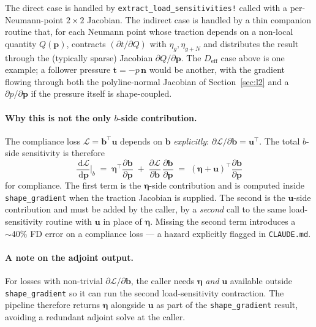 \documentclass[11pt,a4paper]{article}
\newcommand{\vect}[1]{\boldsymbol{#1}}
\newcommand{\pts}{\vect{p}}
\newcommand{\dd}{\,\mathrm{d}}
\newcommand{\Loss}{\mathcal{L}}
\begin{document}
The direct case is handled by
\texttt{extract\_load\_sensitivities!} called with a per-Neumann-point
$2\times 2$ Jacobian. The indirect case is handled by a thin
companion routine that, for each Neumann point whose traction
depends on a non-local quantity $Q(\pts)$, contracts
$(\partial t/\partial Q)$ with $\eta_g, \eta_{g+N}$ and distributes
the result through the (typically sparse) Jacobian
$\partial Q/\partial\pts$. The $D_{\text{eff}}$ case above is one
example; a follower pressure
$\vect t = -p\,\vect n$ would be another, with the gradient
flowing through both the polyline-normal Jacobian
of Section~\ref{sec:l2} and a $\partial p/\partial\pts$ if the
pressure itself is shape-coupled.

\paragraph{Why this is not the only $b$-side contribution.}
The compliance loss $\Loss = \vect b^\top \vect u$ depends on
$\vect b$ \emph{explicitly}: $\partial\Loss/\partial\vect b
= \vect u^\top$. The total $b$-side sensitivity is therefore
\begin{equation}
  \frac{\dd\Loss}{\dd\pts}\Big|_b
  \;=\;
  \vect\eta^\top \frac{\partial\vect b}{\partial\pts}
  \;+\;
  \frac{\partial\Loss}{\partial\vect b}\,
  \frac{\partial\vect b}{\partial\pts}
  \;=\;
  (\vect\eta + \vect u)^\top \frac{\partial\vect b}{\partial\pts}
\end{equation}
for compliance. The first term is the $\vect\eta$-side contribution
and is computed inside \texttt{shape\_gradient} when the traction
Jacobian is supplied. The second is the $\vect u$-side
contribution and must be added by the caller, by a \emph{second}
call to the same load-sensitivity routine with $\vect u$ in place
of $\vect\eta$. Missing the second term introduces a $\sim 40\%$
FD error on a compliance loss --- a hazard explicitly flagged in
\texttt{CLAUDE.md}.

\paragraph{A note on the adjoint output.}
For losses with non-trivial $\partial\Loss/\partial\vect b$, the
caller needs $\vect\eta$ \emph{and} $\vect u$ available outside
\texttt{shape\_gradient} so it can run the second
load-sensitivity contraction. The pipeline therefore returns
$\vect\eta$ alongside $\vect u$ as part of the
\texttt{shape\_gradient} result, avoiding a redundant adjoint
solve at the caller.
\end{document}
